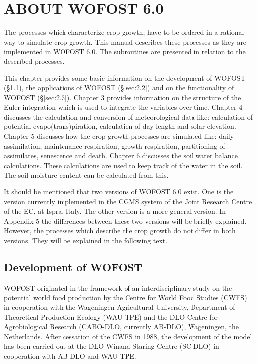\chapter{ABOUT WOFOST 6.0}

The processes which characterize crop growth, have to be ordered in a rational way to
simulate crop growth. This manual describes these processes as they are implemented in
WOFOST 6.0. The subroutines are presented in relation to the described processes. 

This chapter provides some basic information on the development of WOFOST (\S \ref{sec:2.1}),
the applications of WOFOST (\S \ref{sec:2.2}) and on the functionality of WOFOST (\S \ref{sec:2.3}). 
Chapter 3 provides information on the structure of the Euler integration which is used to integrate
the variables over time. Chapter 4 discusses the calculation and conversion of meteorological data like: calculation of potential evapo(trans)piration, calculation of day length and
solar elevation. Chapter 5 discusses how the crop growth processes are simulated like:
daily assimilation, maintenance respiration, growth respiration, partitioning of assimilates,
senescence and death. Chapter 6 discusses the soil water balance calculations. These
calculations are used to keep track of the water in the soil. The soil moisture content can
be calculated from this.

It should be mentioned that two versions of WOFOST 6.0 exist. One is the version
currently implemented in the CGMS system of the Joint Research Centre of the EC, at
Ispra, Italy. The other version is a more general version. In Appendix 5 the differences
between these two versions will be briefly explained. However, the processes which
describe the crop growth do not differ in both versions. They will be explained in the
following text.

\section{Development of WOFOST}
\label{sec:2.1}

WOFOST originated in the framework of an interdisciplinary study on the potential world
food production by the Centre for World Food Studies (CWFS) in cooperation with the
Wageningen Agricultural University, Department of Theoretical Production Ecology
(WAU-TPE) and the DLO-Centre for Agrobiological Research (CABO-DLO, currently
AB-DLO), Wageningen, the Netherlands. After cessation of the CWFS in 1988, the 
development of the model has been carried out at the DLO-Winand Staring Centre (SC-DLO)
in cooperation with AB-DLO and WAU-TPE.

